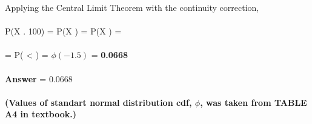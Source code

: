 \documentclass[11pt]{article}
\begin{document}
\noindent Applying the Central Limit Theorem with the continuity correction, \\ \\

 P(X \leq {}. 100) = P(X ) = P(X ) = \\ \\
\indent = P( < ) = $\phi(-1.5)$ = \textbf{0.0668} \\ \\

\noindent \textbf{Answer} = 0.0668 \\ \\

\noindent \textbf{(Values of standart normal distribution cdf, $\phi$, was taken from TABLE A4 in textbook.) } 
\end{document}
